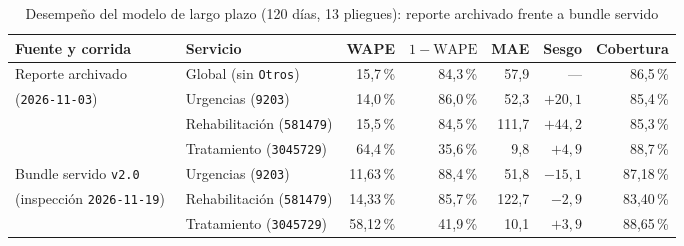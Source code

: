 \begin{table}[t]
\caption{Desempeño del modelo de largo plazo (120 días, 13 pliegues): reporte archivado frente a bundle servido}
\label{tab:largo_plazo_comparado}
\centering
\footnotesize
\begin{tabularx}{\textwidth}{@{}L{0.25\textwidth} Y r r r r r@{}}
\toprule
Fuente y corrida & Servicio & WAPE & $1-\text{WAPE}$ & MAE & Sesgo & Cobertura \\
\midrule
Reporte archivado & Global (sin \texttt{Otros}) & 15,7\,\% & 84,3\,\% & 57,9 & --- & 86,5\,\% \\
(\texttt{2026-11-03})~\cite{mediflow2026largoplazo} & Urgencias (\texttt{9203}) & 14,0\,\% & 86,0\,\% & 52,3 & $+20{,}1$ & 85,4\,\% \\
 & Rehabilitación (\texttt{581479}) & 15,5\,\% & 84,5\,\% & 111,7 & $+44{,}2$ & 85,3\,\% \\
 & Tratamiento (\texttt{3045729}) & 64,4\,\% & 35,6\,\% & 9,8 & $+4{,}9$ & 88,7\,\% \\
\midrule
Bundle servido \texttt{v2.0} & Urgencias (\texttt{9203}) & 11,63\,\% & 88,4\,\% & 51,8 & $-15{,}1$ & 87,18\,\% \\
(inspección \texttt{2026-11-19})~\cite{mediflow2026bundle} & Rehabilitación (\texttt{581479}) & 14,33\,\% & 85,7\,\% & 122,7 & $-2{,}9$ & 83,40\,\% \\
 & Tratamiento (\texttt{3045729}) & 58,12\,\% & 41,9\,\% & 10,1 & $+3{,}9$ & 88,65\,\% \\
\bottomrule
\end{tabularx}
\end{table}
